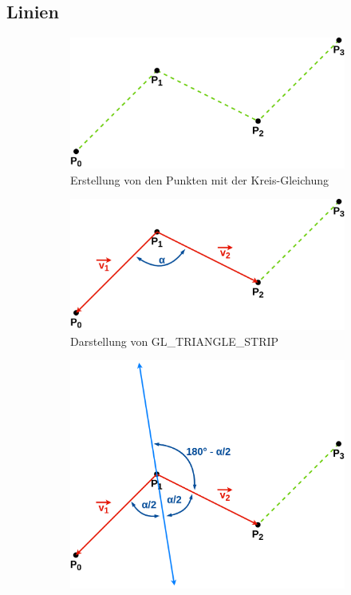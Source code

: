 \documentclass[doktyp=studarbeit]{TUBAFarbeiten}
\begin{document}
\subsection{Linien}

\begin{figure}[!htb]
    \centering
    \begin{subfigure}[b]{0.45\textwidth}
        \centering
        \includegraphics[width=1\linewidth]{Schlangenlinie-1.png}
        \caption{Erstellung von den Punkten mit der Kreis-Gleichung}
    \end{subfigure}
    \qquad
    \begin{subfigure}[b]{0.45\textwidth}
        \centering
        \includegraphics[width=1\linewidth]{Schlangenlinie-2.png}
        \caption{Darstellung von GL\_TRIANGLE\_STRIP}
    \end{subfigure}
    \qquad
    \begin{subfigure}[b]{0.45\textwidth}
        \centering
        \includegraphics[width=1\linewidth]{Schlangenlinie-3.png}

\end{subfigure}
\end{figure}
\end{document}
